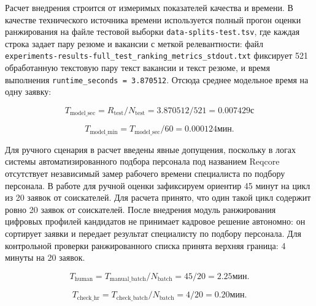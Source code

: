 Расчет внедрения строится от измеримых показателей качества и времени. В качестве технического источника времени используется полный прогон оценки ранжирования на файле тестовой выборки \texttt{data-splits-test.tsv}, где каждая строка задает пару резюме и вакансии с меткой релевантности: файл \texttt{experiments-results-full\_test\_ranking\_metrics\_stdout.txt} фиксирует 521 обработанную текстовую пару текст вакансии и текст резюме, и время выполнения \texttt{runtime\_seconds = 3.870512}. Отсюда среднее модельное время на одну заявку:

\begin{equation}
\label{eq:t_model_sec-15}
T_{\text{model\_sec}} = R_{\text{test}} / N_{\text{test}} = 3.870512 / 521 = 0.007429 \text{с}
\end{equation}

\begin{equation}
\label{eq:t_model_min-16}
T_{\text{model\_min}} = T_{\text{model\_sec}} / 60 = 0.000124 \text{мин.}
\end{equation}

Для ручного сценария в расчет введены явные допущения, поскольку в логах системы автоматизированного подбора персонала под названием Reqcore отсутствует независимый замер рабочего времени специалиста по подбору персонала. В работе для ручной оценки зафиксируем ориентир 45 минут на цикл из 20 заявок от соискателей. Для расчета принято, что один такой цикл содержит ровно 20 заявок от соискателей. После внедрения модуль ранжирования цифровых профилей кандидатов не принимает кадровое решение автономно: он сортирует заявки и передает результат специалисту по подбору персонала. Для контрольной проверки ранжированного списка принята верхняя граница: 4 минуты на 20 заявок.

\begin{equation}
\label{eq:t_human-17}
T_{\text{human}} = T_{\text{manual\_batch}} / N_{\text{batch}} = 45 / 20 = 2.25 \text{мин.}
\end{equation}

\begin{equation}
\label{eq:t_check_hr-18}
T_{\text{check\_hr}} = T_{\text{check\_batch}} / N_{\text{batch}} = 4 / 20 = 0.20 \text{мин.}
\end{equation}

